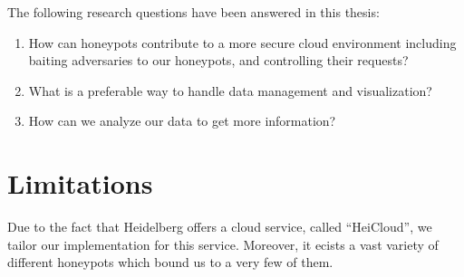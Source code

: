 The following research questions have been answered in this thesis:

\begin{enumerate}
    \item How can honeypots contribute to a more secure cloud environment including baiting adversaries to our honeypots, and controlling their requests?
    \item What is a preferable way to handle data management and visualization?
    \item How can we analyze our data to get more information?
\end{enumerate}

\section{Limitations}

Due to the fact that Heidelberg offers a cloud service, called
\enquote{HeiCloud}, we tailor our implementation for this service. Moreover, it ecists a vast variety of different honeypots which bound us to a very few of them. 